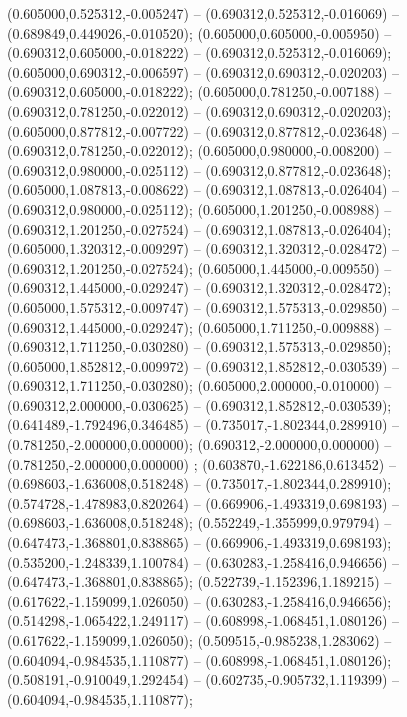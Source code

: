  (0.605000,0.525312,-0.005247) -- (0.690312,0.525312,-0.016069) -- (0.689849,0.449026,-0.010520);
 (0.605000,0.605000,-0.005950) -- (0.690312,0.605000,-0.018222) -- (0.690312,0.525312,-0.016069);
 (0.605000,0.690312,-0.006597) -- (0.690312,0.690312,-0.020203) -- (0.690312,0.605000,-0.018222);
 (0.605000,0.781250,-0.007188) -- (0.690312,0.781250,-0.022012) -- (0.690312,0.690312,-0.020203);
 (0.605000,0.877812,-0.007722) -- (0.690312,0.877812,-0.023648) -- (0.690312,0.781250,-0.022012);
 (0.605000,0.980000,-0.008200) -- (0.690312,0.980000,-0.025112) -- (0.690312,0.877812,-0.023648);
 (0.605000,1.087813,-0.008622) -- (0.690312,1.087813,-0.026404) -- (0.690312,0.980000,-0.025112);
 (0.605000,1.201250,-0.008988) -- (0.690312,1.201250,-0.027524) -- (0.690312,1.087813,-0.026404);
 (0.605000,1.320312,-0.009297) -- (0.690312,1.320312,-0.028472) -- (0.690312,1.201250,-0.027524);
 (0.605000,1.445000,-0.009550) -- (0.690312,1.445000,-0.029247) -- (0.690312,1.320312,-0.028472);
 (0.605000,1.575312,-0.009747) -- (0.690312,1.575313,-0.029850) -- (0.690312,1.445000,-0.029247);
 (0.605000,1.711250,-0.009888) -- (0.690312,1.711250,-0.030280) -- (0.690312,1.575313,-0.029850);
 (0.605000,1.852812,-0.009972) -- (0.690312,1.852812,-0.030539) -- (0.690312,1.711250,-0.030280);
 (0.605000,2.000000,-0.010000) -- (0.690312,2.000000,-0.030625) -- (0.690312,1.852812,-0.030539);
 (0.641489,-1.792496,0.346485) -- (0.735017,-1.802344,0.289910) -- (0.781250,-2.000000,0.000000);
 (0.690312,-2.000000,0.000000) -- (0.781250,-2.000000,0.000000) ;
 (0.603870,-1.622186,0.613452) -- (0.698603,-1.636008,0.518248) -- (0.735017,-1.802344,0.289910);
 (0.574728,-1.478983,0.820264) -- (0.669906,-1.493319,0.698193) -- (0.698603,-1.636008,0.518248);
 (0.552249,-1.355999,0.979794) -- (0.647473,-1.368801,0.838865) -- (0.669906,-1.493319,0.698193);
 (0.535200,-1.248339,1.100784) -- (0.630283,-1.258416,0.946656) -- (0.647473,-1.368801,0.838865);
 (0.522739,-1.152396,1.189215) -- (0.617622,-1.159099,1.026050) -- (0.630283,-1.258416,0.946656);
 (0.514298,-1.065422,1.249117) -- (0.608998,-1.068451,1.080126) -- (0.617622,-1.159099,1.026050);
 (0.509515,-0.985238,1.283062) -- (0.604094,-0.984535,1.110877) -- (0.608998,-1.068451,1.080126);
 (0.508191,-0.910049,1.292454) -- (0.602735,-0.905732,1.119399) -- (0.604094,-0.984535,1.110877);
